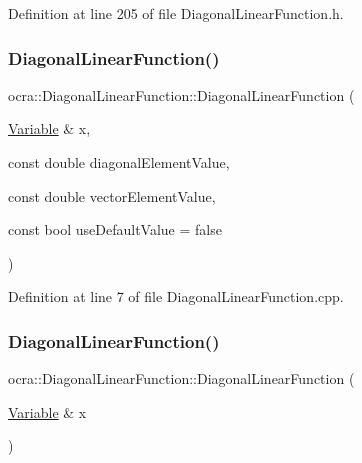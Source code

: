 Definition at line 205 of file Diagonal\+Linear\+Function.\+h.

\hypertarget{classocra_1_1DiagonalLinearFunction_a363e6ca5190cedaf2bbce516d27127f9}{}\label{classocra_1_1DiagonalLinearFunction_a363e6ca5190cedaf2bbce516d27127f9} 
\subsubsection{\texorpdfstring{Diagonal\+Linear\+Function()}{DiagonalLinearFunction()}\hspace{0.1cm}{\footnotesize\ttfamily [4/5]}}
{\footnotesize\ttfamily ocra\+::\+Diagonal\+Linear\+Function\+::\+Diagonal\+Linear\+Function (\begin{DoxyParamCaption}\item[{\hyperlink{classocra_1_1Variable}{Variable} \&}]{x,  }\item[{const double}]{diagonal\+Element\+Value,  }\item[{const double}]{vector\+Element\+Value,  }\item[{const bool}]{use\+Default\+Value = {\ttfamily false} }\end{DoxyParamCaption})}



Definition at line 7 of file Diagonal\+Linear\+Function.\+cpp.

\hypertarget{classocra_1_1DiagonalLinearFunction_ac2c460e4eedb9feba5a74ec967719654}{}\label{classocra_1_1DiagonalLinearFunction_ac2c460e4eedb9feba5a74ec967719654} 
\subsubsection{\texorpdfstring{Diagonal\+Linear\+Function()}{DiagonalLinearFunction()}\hspace{0.1cm}{\footnotesize\ttfamily [5/5]}}
{\footnotesize\ttfamily ocra\+::\+Diagonal\+Linear\+Function\+::\+Diagonal\+Linear\+Function (\begin{DoxyParamCaption}\item[{\hyperlink{classocra_1_1Variable}{Variable} \&}]{x }\end{DoxyParamCaption})\hspace{0.3cm}{\ttfamily [protected]}}


